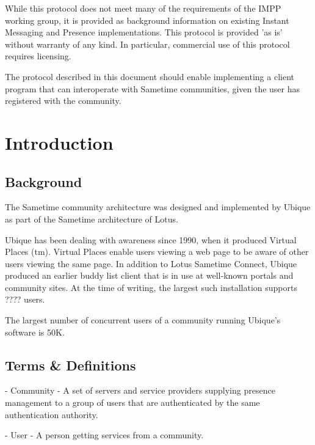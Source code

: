\documentclass[titlepage,oneside]{book}
\begin{document}
\par{} While this protocol does not meet many of the requirements of
the IMPP working group, it is provided as background information on
existing Instant Messaging and Presence implementations. This protocol
is provided 'as is' without warranty of any kind. In particular,
commercial use of this protocol requires licensing.

\par{} The protocol described in this document should enable
implementing a client program that can interoperate with Sametime
communities, given the user has registered with the community.

\chapter{Introduction}

\section{Background}

\par{} The Sametime community architecture was designed and
implemented by Ubique as part of the Sametime architecture of Lotus.

\par{} Ubique has been dealing with awareness since 1990, when it
produced Virtual Places (tm). Virtual Places enable users viewing a
web page to be aware of other users viewing the same page. In addition
to Lotus Sametime Connect, Ubique produced an earlier buddy list
client that is in use at well-known portals and community sites. At
the time of writing, the largest such installation supports ????
users.

\par{} The largest number of concurrent users of a community running
Ubique's software is 50K.

\section{Terms & Definitions}

\par{} - Community - A set of servers and service providers supplying
presence management to a group of users that are authenticated by the
same authentication authority.

\par{} - User - A person getting services from a community.
\end{document}
